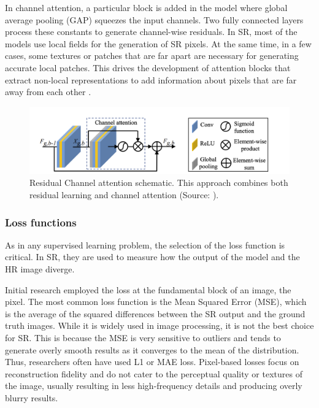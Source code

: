         In channel attention, a particular block is added in the model where global average pooling (GAP) squeezes the input channels. Two fully connected layers process these constants to generate channel-wise residuals.
        In SR, most of the models use local fields for the generation of SR pixels. At the same time, in a few cases, some textures or patches that are far apart are necessary for generating accurate local patches. This drives the development of attention blocks that extract non-local representations to add information about pixels that are far away from each other \cite{Dai2019}.

        \begin{figure}[H]
            \centering
            \includegraphics[width=\textwidth]{Includes/2-feature-attention.png}
            \caption{Residual Channel attention schematic. This approach combines both residual learning and channel attention (Source: \cite{zhang2018image}).}
            \label{fig:2-feature-attention}
        \end{figure}

        \subsubsection{Loss functions}

        As in any supervised learning problem, the selection of the loss function is critical. In SR, they are used to measure how the output of the model and the HR image diverge.
        
        Initial research employed the loss at the fundamental block of an image, the pixel.
        The most common loss function is the Mean Squared Error (MSE), which is the average of the squared differences between the SR output and the ground truth images.
        While it is widely used in image processing, it is not the best choice for SR.
        This is because the MSE is very sensitive to outliers and tends to generate overly smooth results as it converges to the mean of the distribution. Thus, researchers often have used L1 or MAE loss.
        Pixel-based losses focus on reconstruction fidelity and do not cater to the perceptual quality or textures of the image, usually resulting in less high-frequency details and producing overly blurry results.

